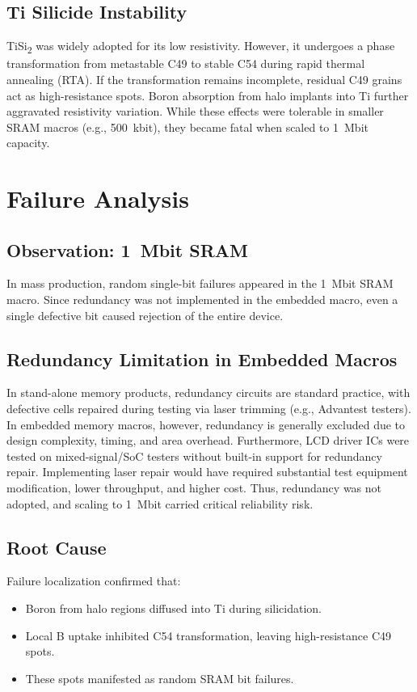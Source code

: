 \documentclass[conference]{IEEEtran}
\begin{document}
\subsection{Ti Silicide Instability}
TiSi\textsubscript{2} was widely adopted for its low resistivity. However, it undergoes a phase transformation from metastable C49 to stable C54 during rapid thermal annealing (RTA).  
If the transformation remains incomplete, residual C49 grains act as high-resistance spots.  
Boron absorption from halo implants into Ti further aggravated resistivity variation.  
While these effects were tolerable in smaller SRAM macros (e.g., 500~kbit), they became fatal when scaled to 1~Mbit capacity.

\section{Failure Analysis}
\subsection{Observation: 1~Mbit SRAM}
In mass production, random single-bit failures appeared in the \SI{1}{Mbit} SRAM macro. Since redundancy was not implemented in the embedded macro, even a single defective bit caused rejection of the entire device.

\subsection{Redundancy Limitation in Embedded Macros}
In stand-alone memory products, redundancy circuits are standard practice, with defective cells repaired during testing via laser trimming (e.g., Advantest testers).  
In embedded memory macros, however, redundancy is generally excluded due to design complexity, timing, and area overhead.  
Furthermore, LCD driver ICs were tested on mixed-signal/SoC testers without built-in support for redundancy repair.  
Implementing laser repair would have required substantial test equipment modification, lower throughput, and higher cost.  
Thus, redundancy was not adopted, and scaling to \SI{1}{Mbit} carried critical reliability risk.

\subsection{Root Cause}
Failure localization confirmed that:
\begin{itemize}
    \item Boron from halo regions diffused into Ti during silicidation.
    \item Local B uptake inhibited C54 transformation, leaving high-resistance C49 spots.
    \item These spots manifested as random SRAM bit failures.
\end{itemize}
\end{document}

